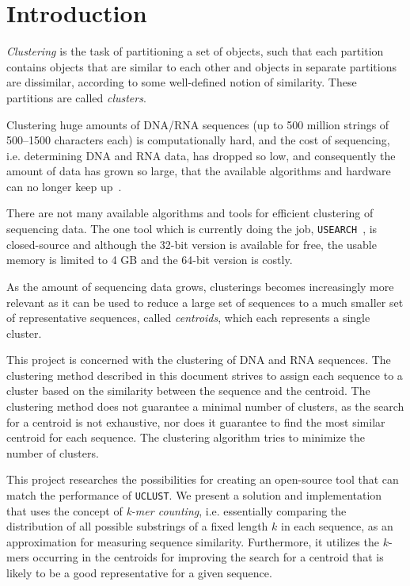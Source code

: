 \section{Introduction}
\label{sec:introduction}

\emph{Clustering} is the task of partitioning a set of objects, such that each
partition contains objects that are similar to each other and objects in
separate partitions are dissimilar, according to some well-defined notion of
similarity. These partitions are called \emph{clusters}.

Clustering huge amounts of DNA/RNA sequences (up to 500 million strings of
500--1500 characters each) is computationally hard, and the cost of sequencing,
i.e. determining DNA and RNA data, has dropped so low, and consequently the
amount of data has grown so large, that the available algorithms and hardware
can no longer keep up~\cite{rothberg}.

There are not many available algorithms and tools for efficient clustering of
sequencing data. The one tool which is currently doing the job,
\texttt{USEARCH}~\cite{edgar,usearch}, is closed-source and although the 32-bit
version is available for free, the usable memory is limited to 4 GB and the
64-bit version is costly.

As the amount of sequencing data grows, clusterings becomes increasingly more
relevant as it can be used to reduce a large set of sequences to a much smaller
set of representative sequences, called \emph{centroids}, which each represents
a single cluster.

This project is concerned with the clustering of DNA and RNA sequences. The
clustering method described in this document strives to assign each sequence to
a cluster based on the similarity between the sequence and the centroid. The
clustering method does not guarantee a minimal number of clusters, as the
search for a centroid is not exhaustive, nor does it guarantee to find the most
similar centroid for each sequence. The clustering algorithm tries to minimize
the number of clusters.

This project researches the possibilities for creating an open-source tool that
can match the performance of \texttt{UCLUST}. We present a solution and
implementation that uses the concept of \emph{k-mer counting}, i.e. essentially
comparing the distribution of all possible substrings of a fixed length $k$ in
each sequence, as an approximation for measuring sequence similarity.
Furthermore, it utilizes the $k$-mers occurring in the centroids for improving
the search for a centroid that is likely to be a good representative for a
given sequence.

